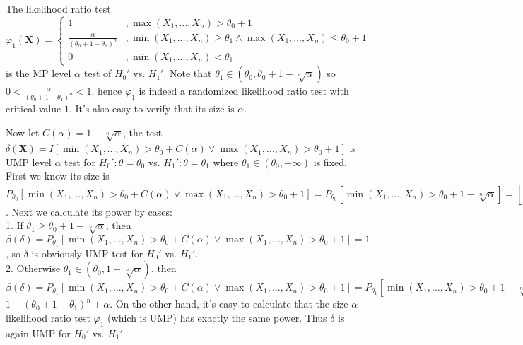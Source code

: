 The likelihood ratio test
$
\varphi_1(\mathbf{X}) =
\left\{\begin{array}{cl}
1 & , \max(X_1, \dots, X_n) > \theta_0+1
\\
\frac{\alpha}{(\theta_0+1-\theta_1)^n} & , \min(X_1, \dots, X_n) \geq \theta_1 \wedge \max(X_1, \dots, X_n) \leq \theta_0+1
\\
0 & , \min(X_1, \dots, X_n) < \theta_1
\end{array}\right.
$
\\
is the MP level $\alpha$ test of $H_0'$ vs. $H_1'$.
Note that $\theta_1 \in (\theta_0, \theta_0+1-\sqrt[n]{\alpha})$ so
$0 < \frac{\alpha}{(\theta_0+1-\theta_1)^n} <1$,
hence $\varphi_1$ is indeed a randomized likelihood ratio test with critical value $1$.
It's also easy to verify that its size is $\alpha$.

Now let $C(\alpha)=1-\sqrt[n]{\alpha}$, the test
$
\delta(\mathbf{X}) =
I\left[
\min(X_1, \dots, X_n)>\theta_0+C(\alpha)
\vee
\max(X_1, \dots, X_n)>\theta_0+1
\right]
$
is UMP level $\alpha$ test for $H_0': \theta=\theta_0$ vs. $H_1': \theta=\theta_1$ where $\theta_1 \in (\theta_0, +\infty)$ is fixed.
First we know its size is
$
P_{\theta_0} \left[
\min(X_1, \dots, X_n)>\theta_0+C(\alpha)
\vee
\max(X_1, \dots, X_n)>\theta_0+1
\right] =
P_{\theta_0} \left[
\min(X_1, \dots, X_n)>\theta_0+1-\sqrt[n]{\alpha}
\right] =
\left[(\theta_0+1)-(\theta_0+1-\sqrt[n]{\alpha})\right]^n = \alpha
$.
Next we calculate its power by cases:\\
1. If $\theta_1 \geq \theta_0 + 1-\sqrt[n]{\alpha}$, then
$
\beta(\delta) =
P_{\theta_1} \left[
\min(X_1, \dots, X_n)>\theta_0+C(\alpha)
\vee
\max(X_1, \dots, X_n)>\theta_0+1
\right] = 1
$,
so $\delta$ is obviously UMP test for $H_0'$ vs. $H_1'$.
\\
2. Otherwise $\theta_1 \in (\theta_0, 1-\sqrt[n]{\alpha})$, then
$
\beta(\delta) =
P_{\theta_1} \left[
\min(X_1, \dots, X_n)>\theta_0+C(\alpha)
\vee
\max(X_1, \dots, X_n)>\theta_0+1
\right] =
P_{\theta_1} \left[
\min(X_1, \dots, X_n)>\theta_0+1-\sqrt[n]{\alpha}
\wedge
\max(X_1, \dots, X_n) \leq \theta_0+1
\right] +
P_{\theta_1} \left[
\max(X_1, \dots, X_n) > \theta_0+1
\right] =
$\\
$
1-(\theta_0+1-\theta_1)^{n} + \alpha
$. On the other hand, it's easy to calculate that the size $\alpha$ likelihood ratio test
$
\varphi_1
$
(which is UMP) has exactly the same power. Thus $\delta$ is again UMP for $H_0'$ vs. $H_1'$.

